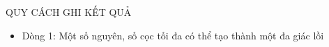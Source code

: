 QUY CÁCH GHI KẾT QUẢ  
\begin{itemize}
	\item     Dòng 1: Một số nguyên, số cọc tối đa có thể tạo thành một đa giác lồi   
\end{itemize}